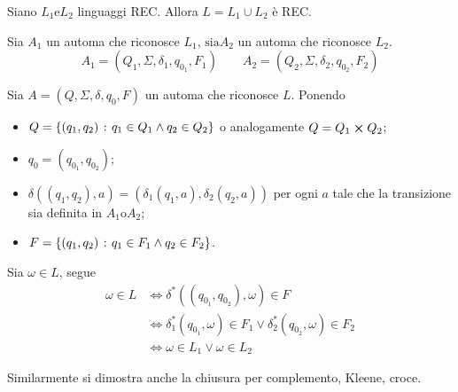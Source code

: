 \documentclass{subfiles}
\begin{document}
\begin{Theorem}
    Siano \(L_{1} \text{e} L_{2}\) linguaggi REC. Allora \(L = L_{1} \cup L_{2}\) è REC.

    \begin{Proof*}
        Sia \(A_{1}\) un automa che riconosce \(L_{1} \text{, sia} A_{2}\) un automa che riconosce \(L_{2}\).
        \[
            A_{1} = (Q_{1}, \Sigma, \delta_{1}, q_{0_{1}}, F_{1}) \qquad A_{2} = (Q_{2}, \Sigma, \delta_{2}, q_{0_{2}}, F_{2})
        \]

        \noindent Sia \(A = (Q, \Sigma, \delta, q_{0}, F)\) un automa che riconosce \(L\). Ponendo
        \begin{itemize}
            \item \(Q = \left\{(q_{1}, q_{2}) \operatorname{\: {:} \:} q_{1} \in Q_{1} \land q_{2} \in Q_{2}\right\}\) o analogamente \(Q = Q_{1} \cp Q_{2}\);
            \item \(q_{0} = (q_{0_{1}}, q_{0_{2}})\);
            \item \(\delta((q_{1}, q_{2}), a) = (\delta_{1}(q_{1}, a), \delta_{2}(q_{2}, a))\) per ogni \(a\) tale che la transizione sia definita in \(A_{1} \text{o} A_{2}\);
            \item \(F = \left\{(q_{1}, q_{2}) \operatorname{\: {:} \:} q_{1} \in F_{1} \land q_{2} \in F_{2}\right\}\).
        \end{itemize}

        \noindent Sia \(\omega \in L\), segue
        \[\begin{aligned}
                \omega \in L & \iff \delta^{*}((q_{0_{1}}, q_{0_{2}}), \omega) \in F                                             \\
                             & \iff \delta_{1}^{*}(q_{0_{1}}, \omega) \in F_{1} \lor \delta_{2}^{*}(q_{0_{2}}, \omega) \in F_{2} \\
                             & \iff \omega \in L_{1} \lor \omega \in L_{2}
            \end{aligned}\]
    \end{Proof*}
\end{Theorem}

\begin{Note*}
    Similarmente si dimostra anche la chiusura per complemento, Kleene, croce.
\end{Note*}

\clearpage
\end{document}
